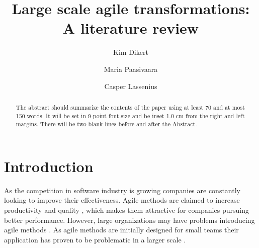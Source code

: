 \documentclass[lnbip]{svmultln}
\begin{document}

\mainmatter

\title{Large scale agile transformations: A literature review}


\author{Kim Dikert \and Maria Paasivaara \and Casper Lassenius}



\maketitle



\begin{abstract}        %
The abstract should summarize the contents of the paper
using at least 70 and at most 150 words. It will be set in 9-point
font size and be inset 1.0 cm from the right and left margins.
There will be two blank lines before and after the Abstract.
\end{abstract}


\section{Introduction}

As the competition in software industry is growing companies are constantly
looking to improve their effectiveness. Agile methods are claimed to increase
productivity and quality \cite{Livermore2008}, which makes them attractive for
companies pursuing better performance. However, large organizations may have
problems introducing agile methods \cite{Dyba2009}. As agile methods are
initially designed for small teams their application has proven to be
problematic in a larger scale \cite{Boehm2005}.
\end{document}

